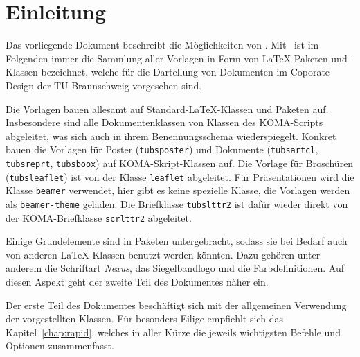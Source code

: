 \chapter{Einleitung}

Das vorliegende Dokument beschreibt die Möglichkeiten von \tubslatex.
Mit \tubslatex\ ist im Folgenden immer die Sammlung aller Vorlagen in Form
von \LaTeX-Paketen und -Klassen bezeichnet, welche für die Dartellung von
Dokumenten im Coporate Design der TU Braunschweig vorgesehen sind.

Die Vorlagen bauen allesamt auf Standard-\LaTeX-Klassen und Paketen auf.
Insbesondere sind alle Dokumentenklassen von Klassen des KOMA-Scripts
abgeleitet, was sich auch in ihrem Benennungsschema wiederspiegelt.
Konkret bauen die Vorlagen für Poster (\texttt{tubsposter}) und Dokumente
(\texttt{tubsartcl}, \texttt{tubsreprt}, \texttt{tubsboox}) auf
KOMA-Skript-Klassen auf. Die Vorlage für Broschüren (\texttt{tubsleaflet})
ist von der Klasse \texttt{leaflet} abgeleitet. Für Präsentationen wird
die Klasse \texttt{beamer} verwendet, hier gibt es keine spezielle Klasse,
die Vorlagen werden als \texttt{beamer-theme} geladen. Die Briefklasse
\texttt{tubslttr2} ist dafür wieder direkt von der KOMA-Briefklasse
\texttt{scrlttr2} abgeleitet.

Einige Grundelemente sind in Paketen untergebracht, sodass sie bei Bedarf auch
von anderen \LaTeX-Klassen benutzt werden könnten. Dazu gehören unter anderem
die Schriftart \emph{Nexus}, das Siegelbandlogo und die Farbdefinitionen.
Auf diesen Aspekt geht der zweite Teil des Dokumentes näher ein.

Der erste Teil des Dokumentes beschäftigt sich mit der allgemeinen Verwendung
der vorgestellten Klassen. Für besonders Eilige empfiehlt sich das
Kapitel~\ref{chap:rapid}, welches in aller Kürze die jeweils wichtigsten
Befehle und Optionen zusammenfasst.
